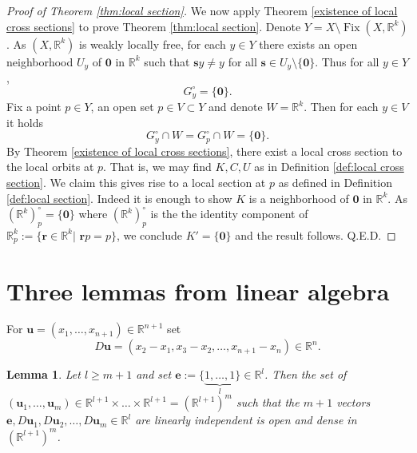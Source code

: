 \documentclass[11pt]{article}
\theoremstyle{plain}
\newtheorem{lem}[thm]{Lemma}
\theoremstyle{definition}
\DeclareMathOperator{\Fix}{Fix}
\def\R{\mathbb{R}}
\def\Rk{\mathbb{R}^k}
\def\ss{\mathbf s}
\def\rr{\mathbf r}
\numberwithin{figure}{section}
\begin{document}
\begin{proof}[Proof of Theorem \ref{thm:local section}]
 We now apply Theorem \ref{existence of local cross sections} to prove Theorem \ref{thm:local section}. Denote $Y=X\setminus\Fix(X,\R^k)$. As $(X,\Rk)$ is weakly locally free, for each $y\in Y$ there exists an open neighborhood $U_y$ of $\mathbf{0}$ in $\Rk$ such that $\ss y\neq y$  for all $\mathbf s\in U_y\setminus\{\mathbf{0}\}$. Thus for all $y\in Y$, 
\begin{equation*}
    G_{y}^\circ=\{\mathbf{0}\}.
\end{equation*}
Fix  a point $p\in Y$, an open set $p\in V\subset Y$ and denote $W=\Rk$. Then for each $y\in V$ it holds
\begin{equation*}
    G_y^\circ\cap W=G_p^\circ\cap W=\{\mathbf{0}\}.
\end{equation*}
 By Theorem \ref{existence of local cross sections}, there exist  a local cross section to the local orbits at $p$. That is,  we may find $K,C,U$ as in Definition \ref{def:local cross section}. We claim this gives rise to a local section at $p$ as defined in Definition \ref{def:local section}. Indeed it is enough to show $K$ is a neighborhood of $\textbf{0}$ in $\Rk$. As $(\Rk)_p^\circ=\{\textbf{0}\}$ where $(\Rk)_p^\circ$ is the 
  the identity component of $\Rk_{p}:=\{ \rr \in \Rk|\,\, \rr p=p\}$, we conclude $K'=\{\textbf{0}\}$ and the result follows.  Q.E.D.
\end{proof}

\section{Three lemmas from linear algebra}
\indent\indent For $\mathbf u=(x_1,\ldots,x_{n+1})\in\R^{n+1}$ set
\begin{equation*}
    D\mathbf u=(x_2-x_1,x_3-x_2,\ldots,x_{n+1}-x_n)\in\R^n.
\end{equation*}
\begin{lem}\cite[Lemma 2.3]{GJT19}\label{lem:ap_1}
    Let $l\geq m+1$ and set $\mathbf e:=\{\underbrace{1,\ldots,1}_{l}\}\in\R^l$. Then the set of $(\mathbf u_1,\ldots,\mathbf u_m)\in\R^{l+1}\times\ldots\times\R^{l+1}=(\R^{l+1})^m$ such that the $m+1$ vectors $\mathbf e,D\mathbf u_1,D\mathbf u_2,\ldots,D\mathbf u_m\in \R^l$ are linearly independent is open and dense in $(\R^{l+1})^m$.
\end{lem}
\end{document}
